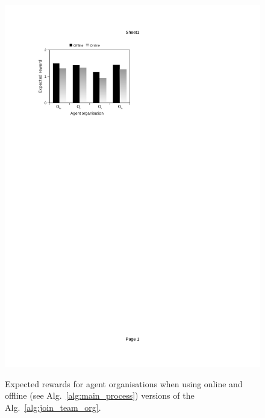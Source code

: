 \documentclass{llncs}
\begin{document}
\begin{figure}[H]
{  \includegraphics[clip=true, trim=70 579 300 90, scale=0.77]{images/w2_dtmc}
}
\caption{Expected rewards for agent organisations when using online and offline (see Alg.~\ref{alg:main_process}) versions of the Alg.~\ref{alg:join_team_org}.}
\label{fig:bar_chart_dtmc}
\end{figure}
\end{document}
